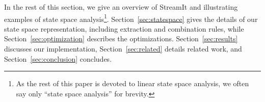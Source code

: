 In the rest of this section, we give an overview of StreamIt and
illustrating examples of state space analysis\footnote{\smaller As the
rest of this paper is devoted to linear state space analysis, we often
say only ``state space analysis'' for brevity.}.
Section~\ref{sec:statespace} gives the details of our state space
representation, including extraction and combination rules, while
Section~\ref{sec:optimization} describes the optimizations.
Section~\ref{sec:results} discusses our implementation,
Section~\ref{sec:related} details related work, and
Section~\ref{sec:conclusion} concludes.







